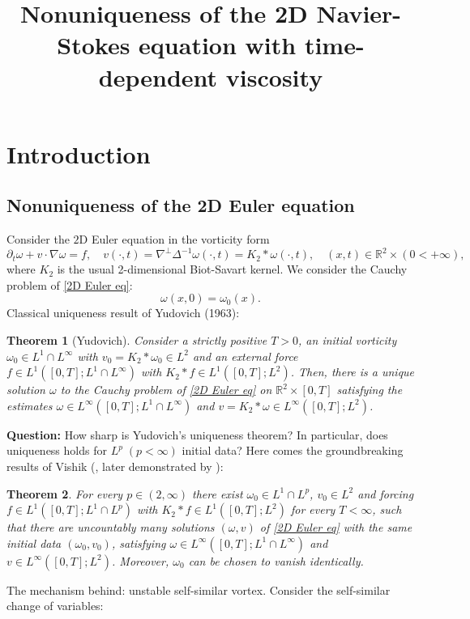 \documentclass{article}
\title{Nonuniqueness of the 2D Navier-Stokes equation with time-dependent viscosity}
\author{}
\date{}
\newcommand{\reall}{\mathbb{R}}
\newcommand{\pa}{\partial}
\newtheorem{theorem}{Theorem}
\numberwithin{equation}{section}
\begin{document}
\maketitle

\section{Introduction}

\subsection{Nonuniqueness of the 2D Euler equation}
Consider the $2$D Euler equation in the vorticity form
\begin{equation}\label{2D Euler eq}
    \pa_t\omega + v\cdot\nabla\omega = f,\quad v(\cdot,t) = \nabla^\perp\Delta^{-1}\omega(\cdot,t) = K_2*\omega(\cdot,t),\quad (x,t)\in\reall^2\times(0<+\infty),\tag{Eu}
\end{equation}
where $K_2$ is the usual 2-dimensional Biot-Savart kernel. We consider the Cauchy problem of \eqref{2D Euler eq}:
\[
    \omega(x,0) = \omega_0(x).
\]
Classical uniqueness result of Yudovich (1963):
\begin{theorem}[Yudovich]
Consider a strictly positive $T>0$, an initial vorticity $\omega_0\in L^1\cap L^\infty$ with $v_0 = K_2*\omega_0\in L^2$ and an external force $f\in L^1([0,T];L^1\cap L^\infty)$ with $K_2*f\in L^1([0,T];L^2)$. Then, there is a unique solution $\omega$ to the Cauchy problem of \eqref{2D Euler eq} on $\reall^2\times[0,T]$ satisfying the estimates $\omega\in L^\infty([0,T];L^1\cap L^\infty)$ and $v = K_2*\omega\in L^\infty([0,T];L^2)$.
\end{theorem}
\textbf{Question:} How sharp is Yudovich's uniqueness theorem? In particular, does uniqueness holds for $L^p\;(p<\infty)$ initial data? Here comes the groundbreaking results of Vishik (\cite{vishik2018I,vishik2018II}, later demonstrated by \cite{Instability_after_Vishik}):
\begin{theorem}
    For every $p\in (2,\infty)$ there exist $\omega_0\in L^1\cap L^p$, $v_0\in L^2$ and forcing $f\in L^1([0,T];L^1\cap L^p)$ with $K_2*f\in L^1([0,T];L^2)$ for every $T<\infty$, such that there are uncountably many solutions $(\omega,v)$ of \eqref{2D Euler eq} with the same  initial data $(\omega_0,v_0)$, satisfying $\omega\in L^\infty([0,T];L^1\cap L^\infty)$ and $v\in L^\infty([0,T];L^2)$. Moreover, $\omega_0$ can be chosen to vanish identically.
\end{theorem}
The mechanism behind: unstable self-similar vortex. Consider the self-similar change of variables:
\end{document}
